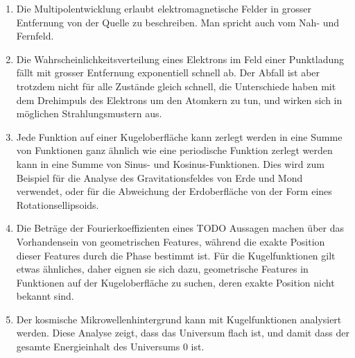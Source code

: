 \begin{enumerate}
\item
Die Multipolentwicklung erlaubt elektromagnetische Felder in grosser
Entfernung von der Quelle zu beschreiben.
Man spricht auch vom Nah- und Fernfeld.
\item
Die Wahrscheinlichkeitsverteilung eines Elektrons im Feld einer Punktladung
fällt mit grosser Entfernung exponentiell schnell ab.
Der Abfall ist aber trotzdem nicht für alle Zustände gleich schnell,
die Unterschiede haben mit dem Drehimpuls des Elektrons um den Atomkern
zu tun, und wirken sich in möglichen Strahlungsmustern aus.
\item
Jede Funktion auf einer Kugeloberfläche kann zerlegt werden in eine
Summe von Funktionen ganz ähnlich wie eine periodische Funktion
zerlegt werden kann in eine Summe von Sinus- und Kosinus-Funktionen.
Dies wird zum Beispiel für die Analyse des Gravitationsfeldes von
Erde und Mond verwendet, oder für die Abweichung der Erdoberfläche
von der Form eines Rotationsellipsoids.
\item 
Die Beträge der Fourierkoeffizienten eines TODO Aussagen machen
über das Vorhandensein von geometrischen Features, während die exakte
Position dieser Features durch die Phase bestimmt ist.
Für die Kugelfunktionen gilt etwas ähnliches, daher eignen sie
sich dazu, geometrische Features in Funktionen auf der Kugeloberfläche
zu suchen, deren exakte Position nicht bekannt sind.
\item
Der kosmische Mikrowellenhintergrund kann mit Kugelfunktionen analysiert
werden.
Diese Analyse zeigt, dass das Universum flach ist, und damit dass der
gesamte Energieinhalt des Universums $0$ ist.
\end{enumerate}









